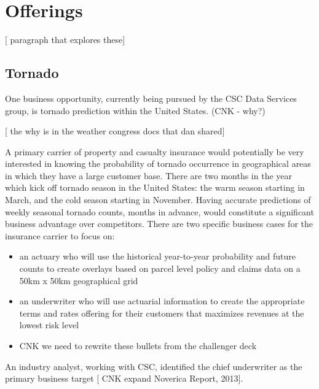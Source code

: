 \section{Offerings}
[ paragraph that explores these]

\subsection{Tornado}
One business opportunity, currently being pursued by the \textsc{CSC} Data Services group, is tornado prediction within the United States. (CNK - why?) 

[ the why is in the weather congress docs that dan shared]

A primary carrier of property and casualty insurance would potentially be very interested in knowing the probability of tornado occurrence in geographical areas in which they have a large customer base. There are two months in the year which kick off tornado season in the United States: the warm season starting in March, and the cold season starting in November. Having accurate predictions of weekly seasonal tornado counts, months in advance, would constitute a significant business advantage over competitors. There are two specific business cases for the insurance carrier to focus on:
\begin{itemize}
    \item an actuary who will use the historical year-to-year probability and future counts to create overlays based on parcel level policy and claims data on a 50km x 50km geographical grid
    \item an underwriter who will use actuarial information to create the appropriate terms and rates offering for their customers that maximizes revenues at the lowest risk level
    \item CNK we need to rewrite these bullets from the challenger deck
\end{itemize}
An industry analyst, working with \textsc{CSC}, identified the chief underwriter as the primary business target [ CNK expand Noverica Report, 2013]. \\

